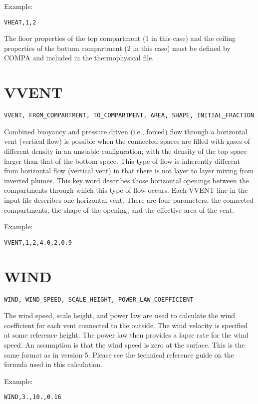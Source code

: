 Example:

\begin{lstlisting}
VHEAT,1,2
\end{lstlisting}

The floor properties of the top compartment (1 in this case) and the ceiling properties of the bottom compartment (2 in this case) must be defined by COMPA and included in the thermophysical file.

\section{VVENT}

\begin{lstlisting}
VVENT, FROM_COMPARTMENT, TO_COMPARTMENT, AREA, SHAPE, INITIAL_FRACTION
\end{lstlisting}

Combined buoyancy and pressure driven (i.e., forced) flow through a horizontal vent (vertical flow) is possible when the connected spaces are filled with gases of different density in an unstable configuration, with the density of the top space larger than that of the bottom space. This type of flow is inherently different from horizontal flow (vertical vent) in that there is not layer to layer mixing from inverted plumes. This key word describes those horizontal openings between the compartments through which this type of flow occurs. Each VVENT line in the input file describes one horizontal vent.  There are four parameters, the connected compartments, the shape of the opening, and the effective area of the vent.

Example:

\begin{lstlisting}
VVENT,1,2,4.0,2,0.9
\end{lstlisting}

\section{WIND}

\begin{lstlisting}
WIND, WIND_SPEED, SCALE_HEIGHT, POWER_LAW_COEFFICIENT
\end{lstlisting}

The wind speed, scale height, and power law are used to calculate the wind coefficient for each vent connected to the outside.  The wind velocity is specified at some reference height.  The power law then provides a lapse rate for the wind speed.  An assumption is that the wind speed is zero at the surface. This is the same format as in version 5. Please see the technical reference guide on the formula used in this calculation.

Example:

\begin{lstlisting}
WIND,3.,10.,0.16
\end{lstlisting}